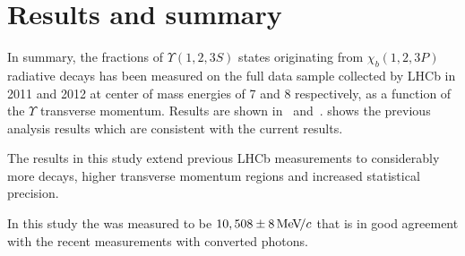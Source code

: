 \section{Results and summary}
\label{sec:results}

In summary, the fractions of $\Upsilon(1,2,3S)$ states originating from $\chi_b(1,2,3P)$ 
radiative decays has been measured on the full data sample collected by LHCb in 2011 and 2012 
at center of mass energies of 7 and 8 \tev respectively, as a function of the $\Upsilon$ 
transverse momentum. Results are shown in~
and~.
 shows the previous analysis results which
are consistent with the current results.






The results in this study extend previous LHCb measurements to considerably
more decays, higher transverse momentum regions and increased statistical
precision.

In this study the \chiboneThreeP was measured to be $10,508 \pm 8 {\mathrm{\,Me\kern -0.1em V\!/}c}$ that
is in good agreement with the recent \lhcb measurements with converted photons.


